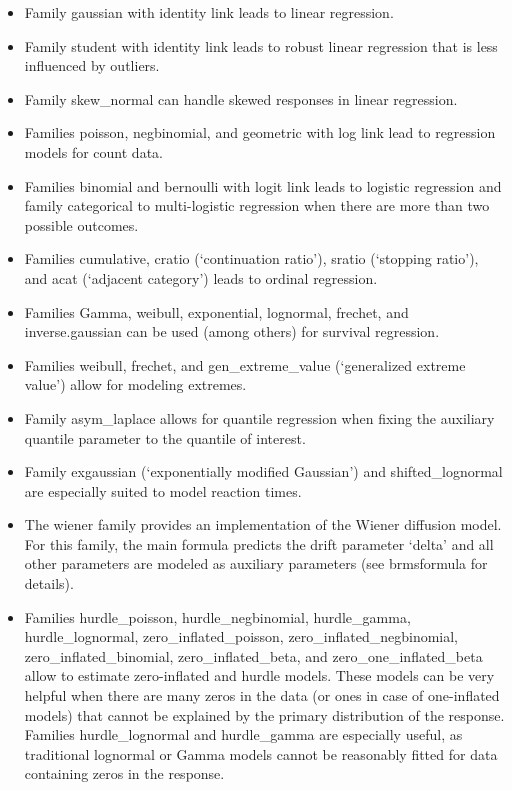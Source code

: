 \documentclass[]{book}
\begin{document}
\begin{itemize}
\item
  Family gaussian with identity link leads to linear regression.
\item
  Family student with identity link leads to robust linear regression
  that is less influenced by outliers.
\item
  Family skew\_normal can handle skewed responses in linear regression.
\item
  Families poisson, negbinomial, and geometric with log link lead to
  regression models for count data.
\item
  Families binomial and bernoulli with logit link leads to logistic
  regression and family categorical to multi-logistic regression when
  there are more than two possible outcomes.
\item
  Families cumulative, cratio (`continuation ratio'), sratio (`stopping
  ratio'), and acat (`adjacent category') leads to ordinal regression.
\item
  Families Gamma, weibull, exponential, lognormal, frechet, and
  inverse.gaussian can be used (among others) for survival regression.
\item
  Families weibull, frechet, and gen\_extreme\_value (`generalized
  extreme value') allow for modeling extremes.
\item
  Family asym\_laplace allows for quantile regression when fixing the
  auxiliary quantile parameter to the quantile of interest.
\item
  Family exgaussian (`exponentially modified Gaussian') and
  shifted\_lognormal are especially suited to model reaction times.
\item
  The wiener family provides an implementation of the Wiener diffusion
  model. For this family, the main formula predicts the drift parameter
  `delta' and all other parameters are modeled as auxiliary parameters
  (see brmsformula for details).
\item
  Families hurdle\_poisson, hurdle\_negbinomial, hurdle\_gamma,
  hurdle\_lognormal, zero\_inflated\_poisson,
  zero\_inflated\_negbinomial, zero\_inflated\_binomial,
  zero\_inflated\_beta, and zero\_one\_inflated\_beta allow to estimate
  zero-inflated and hurdle models. These models can be very helpful when
  there are many zeros in the data (or ones in case of one-inflated
  models) that cannot be explained by the primary distribution of the
  response. Families hurdle\_lognormal and hurdle\_gamma are especially
  useful, as traditional lognormal or Gamma models cannot be reasonably
  fitted for data containing zeros in the response.
\end{itemize}
\end{document}
